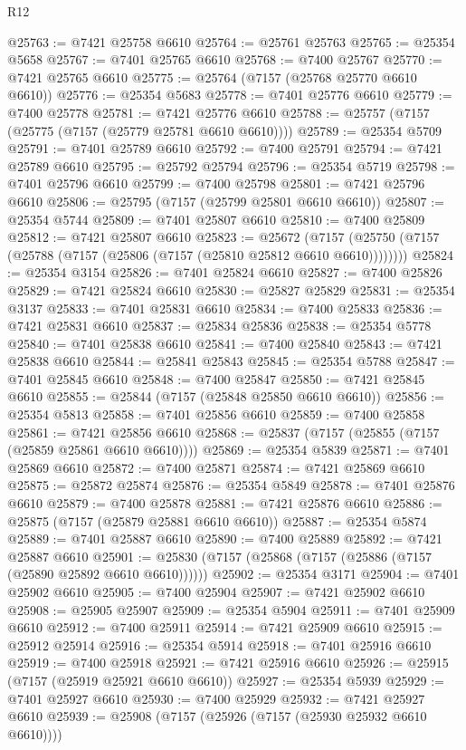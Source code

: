 \begin{lexlean}{R12}
\begin{coremodule}
{{{{{{{{{{{{{{{{{{{{{{{{{{{{{{{{{{{{{{{{{{{{{{{{{{{{{{{{{{{{{{{{{{{{{{{{{{{{{{{{{{@25763 := @7421 @25758 @6610
@25764 := @25761 @25763
@25765 := @25354 @5658
@25767 := @7401 @25765 @6610
@25768 := @7400 @25767
@25770 := @7421 @25765 @6610
@25775 := @25764 (@7157 (@25768 @25770 @6610 @6610))
@25776 := @25354 @5683
@25778 := @7401 @25776 @6610
@25779 := @7400 @25778
@25781 := @7421 @25776 @6610
@25788 := @25757 (@7157 (@25775 (@7157 (@25779 @25781 @6610 @6610))))
@25789 := @25354 @5709
@25791 := @7401 @25789 @6610
@25792 := @7400 @25791
@25794 := @7421 @25789 @6610
@25795 := @25792 @25794
@25796 := @25354 @5719
@25798 := @7401 @25796 @6610
@25799 := @7400 @25798
@25801 := @7421 @25796 @6610
@25806 := @25795 (@7157 (@25799 @25801 @6610 @6610))
@25807 := @25354 @5744
@25809 := @7401 @25807 @6610
@25810 := @7400 @25809
@25812 := @7421 @25807 @6610
@25823 := @25672
    (@7157 (@25750 (@7157 (@25788 (@7157 (@25806 (@7157 (@25810 @25812 @6610 @6610))))))))
@25824 := @25354 @3154
@25826 := @7401 @25824 @6610
@25827 := @7400 @25826
@25829 := @7421 @25824 @6610
@25830 := @25827 @25829
@25831 := @25354 @3137
@25833 := @7401 @25831 @6610
@25834 := @7400 @25833
@25836 := @7421 @25831 @6610
@25837 := @25834 @25836
@25838 := @25354 @5778
@25840 := @7401 @25838 @6610
@25841 := @7400 @25840
@25843 := @7421 @25838 @6610
@25844 := @25841 @25843
@25845 := @25354 @5788
@25847 := @7401 @25845 @6610
@25848 := @7400 @25847
@25850 := @7421 @25845 @6610
@25855 := @25844 (@7157 (@25848 @25850 @6610 @6610))
@25856 := @25354 @5813
@25858 := @7401 @25856 @6610
@25859 := @7400 @25858
@25861 := @7421 @25856 @6610
@25868 := @25837 (@7157 (@25855 (@7157 (@25859 @25861 @6610 @6610))))
@25869 := @25354 @5839
@25871 := @7401 @25869 @6610
@25872 := @7400 @25871
@25874 := @7421 @25869 @6610
@25875 := @25872 @25874
@25876 := @25354 @5849
@25878 := @7401 @25876 @6610
@25879 := @7400 @25878
@25881 := @7421 @25876 @6610
@25886 := @25875 (@7157 (@25879 @25881 @6610 @6610))
@25887 := @25354 @5874
@25889 := @7401 @25887 @6610
@25890 := @7400 @25889
@25892 := @7421 @25887 @6610
@25901 := @25830 (@7157 (@25868 (@7157 (@25886 (@7157 (@25890 @25892 @6610 @6610))))))
@25902 := @25354 @3171
@25904 := @7401 @25902 @6610
@25905 := @7400 @25904
@25907 := @7421 @25902 @6610
@25908 := @25905 @25907
@25909 := @25354 @5904
@25911 := @7401 @25909 @6610
@25912 := @7400 @25911
@25914 := @7421 @25909 @6610
@25915 := @25912 @25914
@25916 := @25354 @5914
@25918 := @7401 @25916 @6610
@25919 := @7400 @25918
@25921 := @7421 @25916 @6610
@25926 := @25915 (@7157 (@25919 @25921 @6610 @6610))
@25927 := @25354 @5939
@25929 := @7401 @25927 @6610
@25930 := @7400 @25929
@25932 := @7421 @25927 @6610
@25939 := @25908 (@7157 (@25926 (@7157 (@25930 @25932 @6610 @6610))))
}}}}}}}}}}}}}}}}}}}}}}}}}}}}}}}}}}}}}}}}}}}}}}}}}}}}}}}}}}}}}}}}}}}}}}}}}}}}}}}}}}
\end{coremodule}
\end{lexlean}
